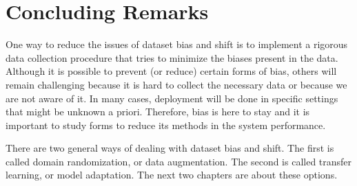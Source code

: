 






\section{Concluding Remarks}

One way to reduce the issues of dataset bias and shift is to implement a rigorous data collection procedure that tries to minimize the biases present in the data. Although it is possible to prevent (or reduce) certain forms of bias, others will remain challenging because it is hard to collect the necessary data or because we are not aware of it. In many cases, deployment will be done in specific settings that might be unknown a priori. Therefore, bias is here to stay and it is important to study forms to reduce its methods in the system performance.  

There are two general ways of dealing with dataset bias and shift. The first is called domain randomization, or data augmentation. The second is called transfer learning, or model adaptation. The next two chapters are about these options.
